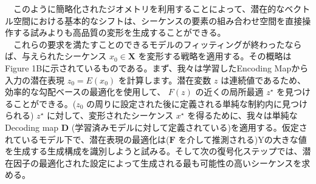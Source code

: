 \documentclass{scrartcl}
\begin{document}
　このように簡略化されたジオメトリを利用することによって、潜在的なベクトル空間における基本的なシフトは、シーケンスの要素の組み合わせ空間を直接操作する試みよりも高品質の変形を生成することができる。\\
　これらの要求を満たすことのできるモデルのフィッティングが終わったならば、与えられたシーケンス \(x_0 \in \bm{X}\) を変形する戦略を適用する。その概略は Figure 1Bに示されているものである。まず、我々は学習したEncoding Mapから入力の潜在表現 \(z_0 = E(x_0)\) を計算します。潜在変数 \(z\) は連続値であるため、効率的な勾配ベースの最適化を使用して、 \(F(z)\) の近くの局所最適 \(z^{\star}\) を見つけることができる。(\(z_0\) の周りに設定された後に定義される単純な制約内に見つけられる) \(z^{\star}\) に対して、変形されたシーケンス \(x^{\star}\) を得るために、我々は単純なDecoding map \(\bm{D}\) (学習済みモデルに対して定義されている)を適用する。仮定されているモデル下で、潜在表現の最適化は(\(\bm{F}\) を介して推測される)Yの大きな値を生成する生成構成を識別しようと試みる。そして次の復号化ステップでは、潜在因子の最適化された設定によって生成される最も可能性の高いシーケンスを求める。\\
\end{document}
